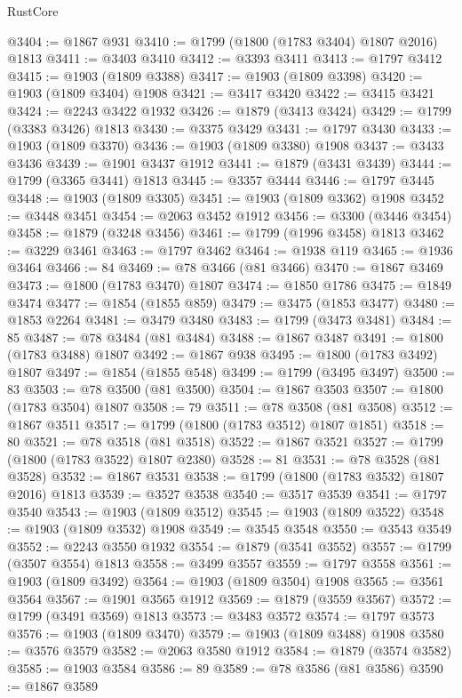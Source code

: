 \begin{lexlean}{RustCore}
\begin{coremodule}
@3404 := @1867 @931
@3410 := @1799 (@1800 (@1783 @3404) @1807 @2016) @1813
@3411 := @3403 @3410
@3412 := @3393 @3411
@3413 := @1797 @3412
@3415 := @1903 (@1809 @3388)
@3417 := @1903 (@1809 @3398)
@3420 := @1903 (@1809 @3404) @1908
@3421 := @3417 @3420
@3422 := @3415 @3421
@3424 := @2243 @3422 @1932
@3426 := @1879 (@3413 @3424)
@3429 := @1799 (@3383 @3426) @1813
@3430 := @3375 @3429
@3431 := @1797 @3430
@3433 := @1903 (@1809 @3370)
@3436 := @1903 (@1809 @3380) @1908
@3437 := @3433 @3436
@3439 := @1901 @3437 @1912
@3441 := @1879 (@3431 @3439)
@3444 := @1799 (@3365 @3441) @1813
@3445 := @3357 @3444
@3446 := @1797 @3445
@3448 := @1903 (@1809 @3305)
@3451 := @1903 (@1809 @3362) @1908
@3452 := @3448 @3451
@3454 := @2063 @3452 @1912
@3456 := @3300 (@3446 @3454)
@3458 := @1879 (@3248 @3456)
@3461 := @1799 (@1996 @3458) @1813
@3462 := @3229 @3461
@3463 := @1797 @3462
@3464 := @1938 @119
@3465 := @1936 @3464
@3466 := 84
@3469 := @78 @3466 (@81 @3466)
@3470 := @1867 @3469
@3473 := @1800 (@1783 @3470) @1807
@3474 := @1850 @1786
@3475 := @1849 @3474
@3477 := @1854 (@1855 @859)
@3479 := @3475 (@1853 @3477)
@3480 := @1853 @2264
@3481 := @3479 @3480
@3483 := @1799 (@3473 @3481)
@3484 := 85
@3487 := @78 @3484 (@81 @3484)
@3488 := @1867 @3487
@3491 := @1800 (@1783 @3488) @1807
@3492 := @1867 @938
@3495 := @1800 (@1783 @3492) @1807
@3497 := @1854 (@1855 @548)
@3499 := @1799 (@3495 @3497)
@3500 := 83
@3503 := @78 @3500 (@81 @3500)
@3504 := @1867 @3503
@3507 := @1800 (@1783 @3504) @1807
@3508 := 79
@3511 := @78 @3508 (@81 @3508)
@3512 := @1867 @3511
@3517 := @1799 (@1800 (@1783 @3512) @1807 @1851)
@3518 := 80
@3521 := @78 @3518 (@81 @3518)
@3522 := @1867 @3521
@3527 := @1799 (@1800 (@1783 @3522) @1807 @2380)
@3528 := 81
@3531 := @78 @3528 (@81 @3528)
@3532 := @1867 @3531
@3538 := @1799 (@1800 (@1783 @3532) @1807 @2016) @1813
@3539 := @3527 @3538
@3540 := @3517 @3539
@3541 := @1797 @3540
@3543 := @1903 (@1809 @3512)
@3545 := @1903 (@1809 @3522)
@3548 := @1903 (@1809 @3532) @1908
@3549 := @3545 @3548
@3550 := @3543 @3549
@3552 := @2243 @3550 @1932
@3554 := @1879 (@3541 @3552)
@3557 := @1799 (@3507 @3554) @1813
@3558 := @3499 @3557
@3559 := @1797 @3558
@3561 := @1903 (@1809 @3492)
@3564 := @1903 (@1809 @3504) @1908
@3565 := @3561 @3564
@3567 := @1901 @3565 @1912
@3569 := @1879 (@3559 @3567)
@3572 := @1799 (@3491 @3569) @1813
@3573 := @3483 @3572
@3574 := @1797 @3573
@3576 := @1903 (@1809 @3470)
@3579 := @1903 (@1809 @3488) @1908
@3580 := @3576 @3579
@3582 := @2063 @3580 @1912
@3584 := @1879 (@3574 @3582)
@3585 := @1903 @3584
@3586 := 89
@3589 := @78 @3586 (@81 @3586)
@3590 := @1867 @3589

\end{coremodule}
\end{lexlean}
